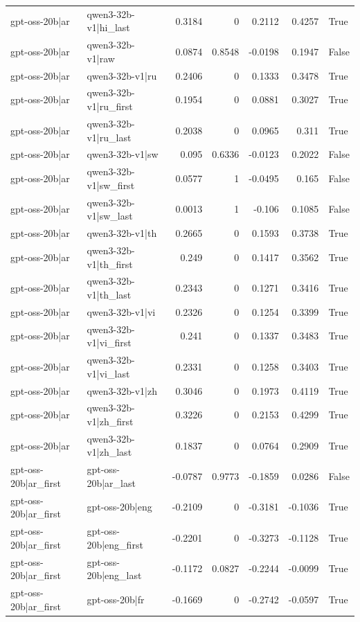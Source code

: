 \begin{table}
\begin{tabular}{l l r r r r l}
gpt-oss-20b|ar & qwen3-32b-v1|hi_last & 0.3184 & 0 & 0.2112 & 0.4257 & True \\
gpt-oss-20b|ar & qwen3-32b-v1|raw & 0.0874 & 0.8548 & -0.0198 & 0.1947 & False \\
gpt-oss-20b|ar & qwen3-32b-v1|ru & 0.2406 & 0 & 0.1333 & 0.3478 & True \\
gpt-oss-20b|ar & qwen3-32b-v1|ru_first & 0.1954 & 0 & 0.0881 & 0.3027 & True \\
gpt-oss-20b|ar & qwen3-32b-v1|ru_last & 0.2038 & 0 & 0.0965 & 0.311 & True \\
gpt-oss-20b|ar & qwen3-32b-v1|sw & 0.095 & 0.6336 & -0.0123 & 0.2022 & False \\
gpt-oss-20b|ar & qwen3-32b-v1|sw_first & 0.0577 & 1 & -0.0495 & 0.165 & False \\
gpt-oss-20b|ar & qwen3-32b-v1|sw_last & 0.0013 & 1 & -0.106 & 0.1085 & False \\
gpt-oss-20b|ar & qwen3-32b-v1|th & 0.2665 & 0 & 0.1593 & 0.3738 & True \\
gpt-oss-20b|ar & qwen3-32b-v1|th_first & 0.249 & 0 & 0.1417 & 0.3562 & True \\
gpt-oss-20b|ar & qwen3-32b-v1|th_last & 0.2343 & 0 & 0.1271 & 0.3416 & True \\
gpt-oss-20b|ar & qwen3-32b-v1|vi & 0.2326 & 0 & 0.1254 & 0.3399 & True \\
gpt-oss-20b|ar & qwen3-32b-v1|vi_first & 0.241 & 0 & 0.1337 & 0.3483 & True \\
gpt-oss-20b|ar & qwen3-32b-v1|vi_last & 0.2331 & 0 & 0.1258 & 0.3403 & True \\
gpt-oss-20b|ar & qwen3-32b-v1|zh & 0.3046 & 0 & 0.1973 & 0.4119 & True \\
gpt-oss-20b|ar & qwen3-32b-v1|zh_first & 0.3226 & 0 & 0.2153 & 0.4299 & True \\
gpt-oss-20b|ar & qwen3-32b-v1|zh_last & 0.1837 & 0 & 0.0764 & 0.2909 & True \\
gpt-oss-20b|ar_first & gpt-oss-20b|ar_last & -0.0787 & 0.9773 & -0.1859 & 0.0286 & False \\
gpt-oss-20b|ar_first & gpt-oss-20b|eng & -0.2109 & 0 & -0.3181 & -0.1036 & True \\
gpt-oss-20b|ar_first & gpt-oss-20b|eng_first & -0.2201 & 0 & -0.3273 & -0.1128 & True \\
gpt-oss-20b|ar_first & gpt-oss-20b|eng_last & -0.1172 & 0.0827 & -0.2244 & -0.0099 & True \\
gpt-oss-20b|ar_first & gpt-oss-20b|fr & -0.1669 & 0 & -0.2742 & -0.0597 & True \\

\end{tabular}
\end{table}
